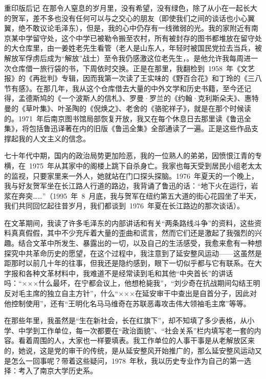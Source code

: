 \begin{pre-post-text}{重印版后记}
在那令人窒息的岁月里，没有希望，没有绿色，除了从小在一起长大的贺军，差不多也没有任何可以与之交心的朋友（即使我们之间的谈话也小心翼翼，绝不敢议论毛泽东），但是，我的心中仍存有一线微弱的光。我的家附近有南京某中学留守处，这个中学已被勒令搬至农村，所有被封存的图书都堆放在留守处的大仓库里，由一姜姓老先生看管（老人是山东人，年轻时被国民党拉去当兵，被解放军俘虏后成为“解放”战士）至令我仍感激这位老先生，。是他允许我每周进一次仓库借一旅行袋的书，下周依时交换。正是在那里，我翻检到~1958~年《文艺报》的《再批判》专辑，因而我第一次读了王实味的《野百合花》和丁玲的《三八节有感》。在那几年，我从这个仓库借去大量的中外文学和历史书籍，至今还记得，孟德斯鸠的《一个波斯人的信札》、罗曼·罗兰的《约翰·克利斯朵夫》、惠特曼的《草叶集》、叶圣陶的《倪焕之》、老舍的《骆驼祥子》，就是在那个时候读的。1971~年后南京图书馆局部恢复开放，我又在每个休息日去那里读《鲁迅全集》，将包括鲁迅译著在内的旧版《鲁迅全集》全部通读了一遍。正是这些作品支撑起我的人文主义的信念。

七十年代中期，国内的政治局势更加险恶，我的一位熟人的弟弟，因愤恨江青的专横，在~1975~年从其家中的阁楼上跳下自杀身亡。我家也每天受到居民小组老太太的监视，只要家里来一外人，她就站在门口探头探脑。1976~年夏天的一个晚上，我与好友贺军坐在长江路人行道的路边，我背诵了鲁迅的话：“地下火在运行，岩浆在奔突……”（1995~年~8~月底，我与贺军在纽约第五大道的街心花园坐了半天，我们共同回忆起往昔岁月，我们都谈到~1976~年夏在长江路边的那次谈话）。

在文革期间，我读了许多毛泽东的内部讲话和有关“两条路线斗争”的资料，这些资料真真假假，其中不少充斥着大量的歪曲和谎言，然而它们还是激起了我强烈的兴趣。结合文革中所发生、暴露出的一切，以及自己的生活感受，我愈来愈有一种想探究中共革命历史的愿望，在这个过程中，我注意到了延安整风运动——这虽然是距那时以前几十年的往事，但我还是隐约感到，眼下一切似乎都与它有联系。在大字报和各种文革材料中，我难道不是经常读到毛和其他“中央首长”的讲话吗：“×××什么最坏，在宁都会议上，他想枪毙我”，“刘少奇在抗战期间勾结王明反对毛主席的独立自主方针”，什么“×××在延安审干中查出是自首分子，因此对他控制使用”，还有“王明化名马马维奇在苏联恶毒攻击伟大领袖毛主席”等等。

在那些年里，我虽然是“生在新社会，长在红旗下”，却不知填了多少表格，从小学、中学到工作单位，每一次都要在“政治面貌”、“社会关系”栏内填写老一套的内容。看着周围的人，大家也一样要填表。我工作单位的人事干事是从老解放区来的，她说，这是党的审干的传统，是从延安整风开始推广的，那么延安整风运动又是怎么一回事呢？带着这些疑问，1978~年秋，我以历史专业作为自己的第一选择：考入了南京大学历史系。


\end{pre-post-text}
